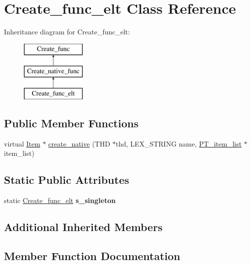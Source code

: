\hypertarget{classCreate__func__elt}{}\section{Create\+\_\+func\+\_\+elt Class Reference}
\label{classCreate__func__elt}
Inheritance diagram for Create\+\_\+func\+\_\+elt\+:\begin{figure}[H]
\begin{center}
\leavevmode
\includegraphics[height=3.000000cm]{classCreate__func__elt}
\end{center}
\end{figure}
\subsection*{Public Member Functions}
\begin{DoxyCompactItemize}
\item 
virtual \mbox{\hyperlink{classItem}{Item}} $\ast$ \mbox{\hyperlink{classCreate__func__elt_a54ed451dd740c907447d8bced85b13c2}{create\+\_\+native}} (T\+HD $\ast$thd, L\+E\+X\+\_\+\+S\+T\+R\+I\+NG name, \mbox{\hyperlink{classPT__item__list}{P\+T\+\_\+item\+\_\+list}} $\ast$item\+\_\+list)
\end{DoxyCompactItemize}
\subsection*{Static Public Attributes}
\begin{DoxyCompactItemize}
\item 
\mbox{\label{classCreate__func__elt_ab9714c32057d8302254d7c17d09052b3}} 
static \mbox{\hyperlink{classCreate__func__elt}{Create\+\_\+func\+\_\+elt}} {\bfseries s\+\_\+singleton}
\end{DoxyCompactItemize}
\subsection*{Additional Inherited Members}


\subsection{Member Function Documentation}
\mbox{\label{classCreate__func__elt_a54ed451dd740c907447d8bced85b13c2}} 
